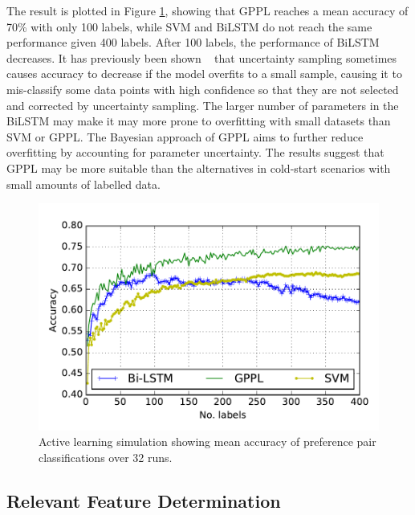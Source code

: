 The result is plotted in Figure \ref{fig:active_learning}, showing that GPPL
reaches a mean accuracy of 70\% with only 100 labels, while SVM and BiLSTM do not reach the same performance given 400 labels. 
After 100 labels, the 
performance of BiLSTM decreases. It has previously been shown ~\cite{cawley2011baseline,guyon2011results,settles2010active} that uncertainty sampling sometimes causes accuracy to decrease if the model overfits to a small sample, causing it to mis-classify some data points with high confidence so that they are not selected and corrected by uncertainty sampling.  
The larger number of parameters in the BiLSTM may make it may more prone to overfitting with small datasets than SVM or GPPL. 
The Bayesian approach of GPPL aims to further 
reduce overfitting by accounting for parameter uncertainty.
The results suggest that GPPL may be more suitable than the alternatives in cold-start scenarios with small amounts of labelled data. 
\begin{figure}
\centering
\includegraphics[width=0.9\columnwidth,trim=14 17 10 22,clip=true]{figures/active_learning_2/test_acc}
\caption{Active learning simulation showing mean accuracy of preference pair classifications over 32 runs.}
\label{fig:active_learning}
\end{figure}

\subsection{Relevant Feature Determination}

